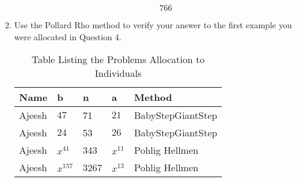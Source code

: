 \documentclass[11pt,a4paper,fleqn]{article}
\begin{document}
\begin{enumerate}[1.]
\begin{flushleft}
\begin{enumerate}
\begin{mdframed}
					\begin{dmath}\label{(10)}
						766
					\end{dmath}
				\end{mdframed}
			\end{enumerate}
		\end{flushleft}
		\item Use the Pollard Rho method to verify your answer to the first example you were allocated in Question 4.

		\begin{table}[H]
			\begin{adjustbox}{scale=0.9,center}
				\begin{tabular}{ |p{2cm}|p{2cm}|p{2cm}|p{2cm}|p{4cm}| }
					\hline
					Name & b & n & a & Method \\
					\hline
					Ajeesh & $47$   & 71   & $21$   & BabyStepGiantStep \\
					Ajeesh & $24$   & 53   & $26$   & BabyStepGiantStep  \\
					Ajeesh & $x^{41}$ & 343  & $x^{11}$ & Pohlig Hellmen \\
					Ajeesh & $x^{157}$& 3267 & $x^{13}$ & Pohlig Hellmen  \\
					\hline
				\end{tabular}
			\end{adjustbox}
			\caption{Table Listing the Problems Allocation to Individuals}
			\label{table:assignment-tab}
		\end{table}


\end{enumerate}
\end{document}

